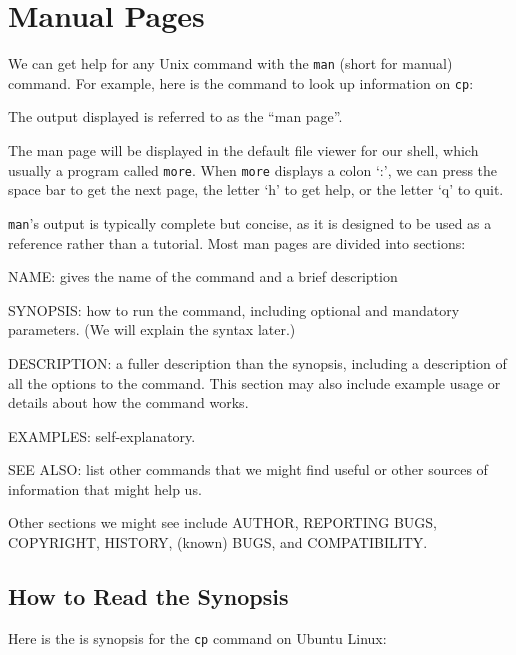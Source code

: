 \section{Manual Pages}

We can get help for any Unix command with the \texttt{man} (short for
manual) command. For example, here is the command to look up information
on \texttt{cp}:


The output displayed is referred to as the ``man page''.

The man page will be displayed in the default file viewer for our shell,
which usually a program called \texttt{more}. When \texttt{more}
displays a colon `:', we can press the space bar to get the next page,
the letter `h' to get help, or the letter `q' to quit.

\texttt{man}'s output is typically complete but concise, as it is
designed to be used as a reference rather than a tutorial. Most man
pages are divided into sections:

\begin{swcitemize}
\item
  NAME: gives the name of the command and a brief description
\item
  SYNOPSIS: how to run the command, including optional and mandatory
  parameters. (We will explain the syntax later.)
\item
  DESCRIPTION: a fuller description than the synopsis, including a
  description of all the options to the command. This section may also
  include example usage or details about how the command works.
\item
  EXAMPLES: self-explanatory.
\item
  SEE ALSO: list other commands that we might find useful or other
  sources of information that might help us.
\end{swcitemize}

Other sections we might see include AUTHOR, REPORTING BUGS, COPYRIGHT,
HISTORY, (known) BUGS, and COMPATIBILITY.

\subsection*{How to Read the Synopsis}

Here is the is synopsis for the \texttt{cp} command on Ubuntu Linux:

